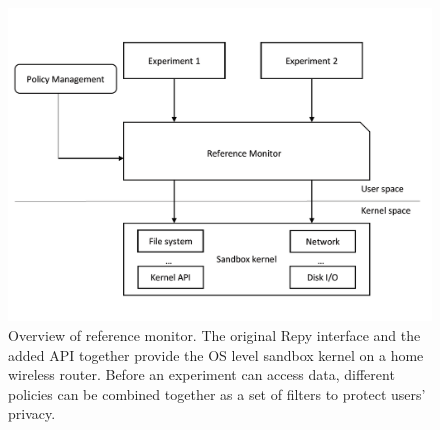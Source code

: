 \begin{figure}%
\centering
\includegraphics[width=0.8\columnwidth]{figure/referencemonitor.png}
\caption{Overview of reference monitor. The original Repy interface and the added API together provide the OS level sandbox kernel on a home wireless router. Before an experiment can access data, different policies can be combined together as a set of filters to protect users' privacy.}
\label{fig-reference}
\end{figure}
